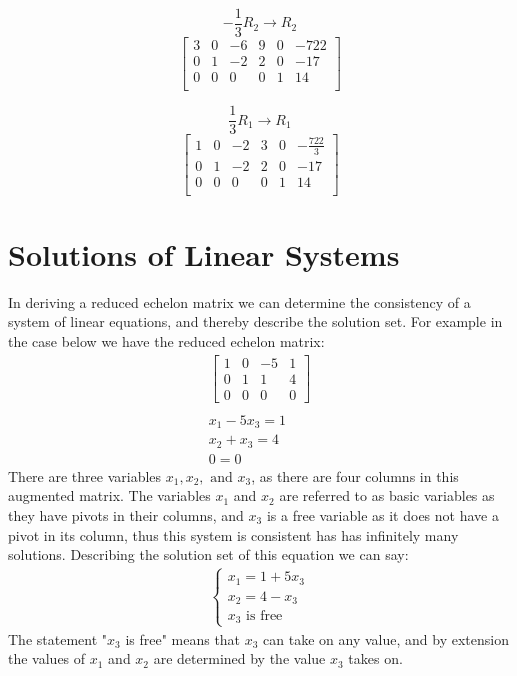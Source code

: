 \documentclass[12pt letter]{report}
\begin{document}
{  \[
    -\frac{1}{3}R_2 \to R_2
  \]
  \[
    \begin{bmatrix}
      3 & 0 & -6 & 9 & 0 & -722 \\
      0 & 1 & -2 & 2 & 0 & -17  \\
      0 & 0 & 0  & 0 & 1 & 14   \\
    \end{bmatrix}
  \]

  \[
    \frac{1}{3}R_1 \to R_1
  \]
  \[
    \begin{bmatrix}
      1 & 0 & -2 & 3 & 0 & -\frac{722}{3} \\
      0 & 1 & -2 & 2 & 0 & -17            \\
      0 & 0 & 0  & 0 & 1 & 14             \\
    \end{bmatrix}
  \]
}

\section{Solutions of Linear Systems}




In deriving a reduced echelon matrix we can determine the consistency of a system of linear equations, and thereby
describe the solution set. For example in the case below we have the reduced echelon matrix:
\begin{align*}
  \begin{bmatrix}
    1 & 0 & -5 & 1 \\
    0 & 1 & 1  & 4 \\
    0 & 0 & 0  & 0
  \end{bmatrix}
  \\
  \\
  x_1 - 5x_3 = 1 \\
  x_2 + x_3 = 4  \\
  0 = 0
\end{align*}
There are three variables $x_1, x_2, \text{ and } x_3$, as there are four columns in this augmented matrix. The
variables $x_1$ and $x_2$ are referred to as basic variables as they have pivots in their columns, and $x_3$ is a free
variable as it does not have a pivot in its column, thus this system is consistent has has infinitely many solutions.
Describing the solution set of this equation we can say:
\begin{align*}
  \begin{cases}
    x_1 = 1 + 5x_3 \\
    x_2 = 4 - x_3  \\
    x_3 \text{ is free}
  \end{cases}
\end{align*}
The statement "$x_3$ is free" means that $x_3$ can take on any value, and by extension the values of $x_1$ and $x_2$
are determined by the value $x_3$ takes on.
\end{document}
